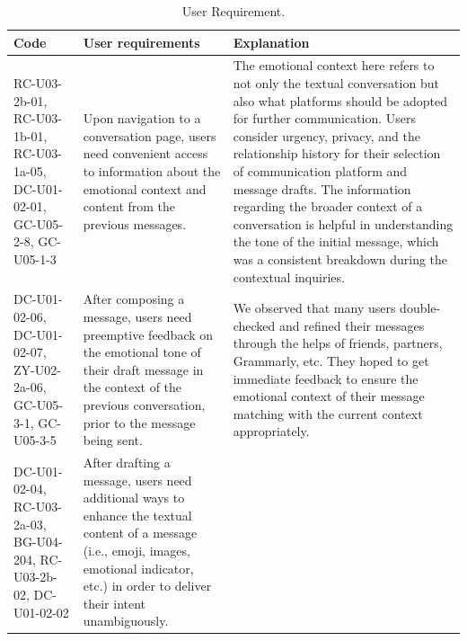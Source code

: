\documentclass[acmsmall,screen,authorversion,nonacm]{acmart}
\begin{document}
\begin{table}[h]
  \caption{User Requirement.}
  \vspace{-1pc}
  \label{tab:user_requirement}
  \begin{center}
  \begin{tabular}{|p{}|p{}|p{}|}
    \hline
    Code & User requirements & Explanation \\
    \hline
    RC-U03-2b-01, \newline RC-U03-1b-01, \newline RC-U03-1a-05, \newline DC-U01-02-01, \newline GC-U05-2-8, \newline GC-U05-1-3 
    & 
    Upon navigation to a conversation page, users need convenient access to information about the emotional context and content from the previous messages. 
    & 
    The emotional context here refers to not only the textual conversation but also what platforms should be adopted for further communication. Users consider urgency, privacy, and the relationship history for their selection of communication platform and message drafts. The information regarding the broader context of a conversation is helpful in understanding the tone of the initial message, which was a consistent breakdown during the contextual inquiries.
    \\
    \hline    
    DC-U01-02-06, \newline DC-U01-02-07, \newline ZY-U02-2a-06, \newline GC-U05-3-1, \newline  GC-U05-3-5
    & 
    After composing a message, users need preemptive feedback on the emotional tone of their draft message in the context of the previous conversation, prior to the message being sent.
    & 
    We observed that many users double-checked and refined their messages through the helps of friends, partners, Grammarly, etc. They hoped to get immediate feedback to ensure the emotional context of their message matching with the current context appropriately.
    \\
    \hline
    DC-U01-02-04, \newline RC-U03-2a-03, \newline BG-U04-204, \newline RC-U03-2b-02, \newline DC-U01-02-02
    & 
    After drafting a message, users need additional ways to enhance the textual content of a message (i.e., emoji, images, emotional indicator, etc.) in order to deliver their intent unambiguously.

\end{tabular}
\end{center}
\end{table}
\end{document}
